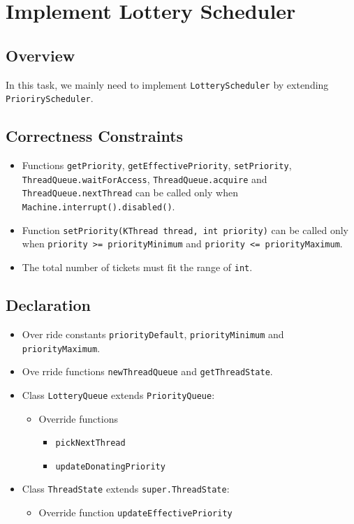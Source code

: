 \documentclass{article}
\begin{document}
\section{Implement Lottery Scheduler}
\subsection{Overview}
In this task, we mainly need to implement \texttt{LotteryScheduler} by extending \texttt{PrioriryScheduler}.
\subsection{Correctness Constraints}
\begin{itemize}
    \item
        Functions \texttt{getPriority}, \texttt{getEffectivePriority}, \texttt{setPriority},
        \texttt{ThreadQueue.waitForAccess}, \texttt{ThreadQueue.acquire} and
        \texttt{ThreadQueue.nextThread} can be called only when \texttt{Machine.interrupt().disabled()}.
    \item
        Function \texttt{setPriority(KThread thread, int priority)} can be called only when
        \texttt{priority >= priorityMinimum} and \texttt{priority <= priorityMaximum}.
    \item
        The total number of tickets must fit the range of \texttt{int}.
\end{itemize}
\subsection{Declaration}
\begin{itemize}
    \item
        Over ride constants \texttt{priorityDefault}, \texttt{priorityMinimum} and \texttt{priorityMaximum}.
    \item
        Ove rride functions \texttt{newThreadQueue} and \texttt{getThreadState}.
    \item
        Class \texttt{LotteryQueue} extends \texttt{PriorityQueue}:
        \begin{itemize}
            \item 
                Override functions
                \begin{itemize}
                    \item \texttt{pickNextThread}
                    \item \texttt{updateDonatingPriority}
                \end{itemize}
        \end{itemize}
    \item 
        Class \texttt{ThreadState} extends \texttt{super.ThreadState}:
        \begin{itemize}
            \item
                Override function \texttt{updateEffectivePriority}
        \end{itemize}
\end{itemize}
\end{document}
